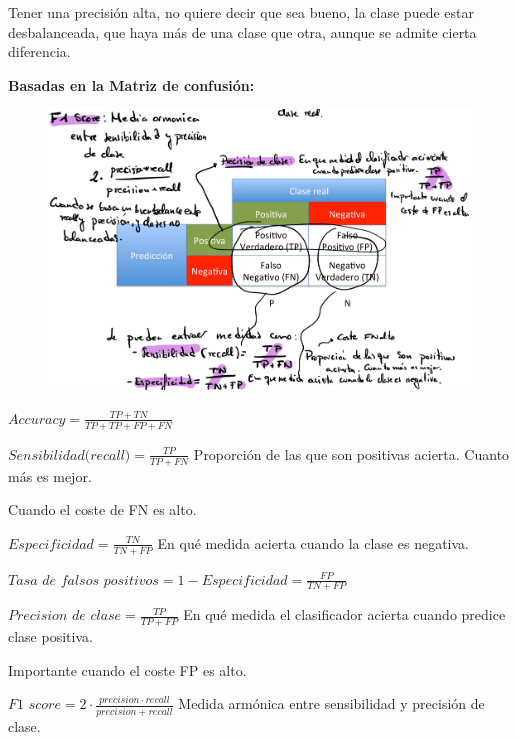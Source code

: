 \documentclass[12pt, twoside, openright]{report} %
\begin{document}
Tener una precisión alta, no quiere decir que sea bueno, la clase puede
estar desbalanceada, que haya más de una clase que otra, aunque se
admite cierta diferencia.

\textbf{Basadas en la Matriz de confusión:}

\begin{figure}[H]
	{\includegraphics[scale=.2]{Untitled 11.png}}
\end{figure}

\(Accuracy= \frac {TP+TN}{TP+TP+FP+FN}\)

\(\textit{Sensibilidad(recall)}= \frac {TP}{TP+FN}\) Proporción de las que son
positivas acierta. Cuanto más es mejor.

Cuando el coste de FN es alto.

\(\textit{Especificidad}= \frac {TN}{TN+FP}\) En qué medida acierta cuando la
clase es negativa.

\(\textit{Tasa de falsos positivos}=1-\textit{Especificidad}= \frac {FP}{TN+FP}\)

\(\textit{Precision de clase}= \frac {TP}{TP+FP}\) En qué medida el
clasificador acierta cuando predice clase positiva.

Importante cuando el coste FP es alto.

\(\textit{F1 score}= 2\cdot \frac {precision \cdot recall}{precision +recall}\)
Medida armónica entre sensibilidad y precisión de clase.
\end{document}
